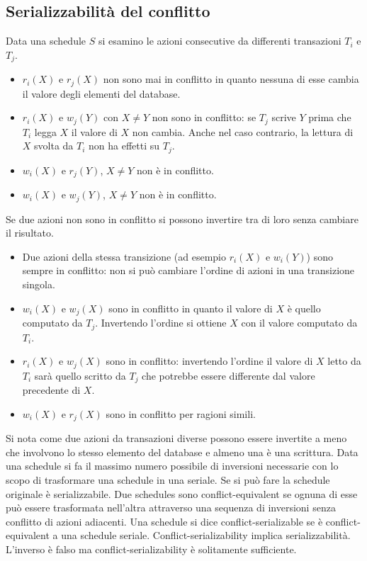 \subsection{Serializzabilit\`a del conflitto}
Data una schedule $S$ si esamino le azioni consecutive da differenti transazioni $T_i$ e $T_j$.
\begin{itemize}
\item $r_i(X)$ e $r_j(X)$ non sono mai in conflitto in quanto nessuna di esse cambia il valore degli elementi del database.
\item $r_i(X)$ e $w_j(Y)$ con $X\neq Y$ non sono in conflitto: se $T_j$ scrive $Y$ prima che $T_i$ legga $X$ il valore di $X$ non cambia. Anche nel caso contrario, la lettura di $X$ svolta da $T_i$ non ha effetti su $T_j$.
\item $w_i(X)$ e $r_j(Y)$, $X\neq Y$ non \`e in conflitto.
\item $w_i(X)$ e $w_j(Y)$, $X\neq Y$ non \`e in conflitto.
\end{itemize}
Se due azioni non sono in conflitto si possono invertire tra di loro senza cambiare il risultato.
\begin{itemize}
\item Due azioni della stessa transizione (ad esempio $r_i(X)$ e $w_i(Y)$) sono sempre in conflitto: non si pu\`o cambiare l'ordine di azioni in una transizione singola.
\item $w_i(X)$ e $w_j(X)$ sono in conflitto in quanto il valore di $X$ \`e quello computato da $T_j$. Invertendo l'ordine si ottiene $X$ con il valore computato da $T_i$.
\item $r_i(X)$ e $w_j(X)$ sono in conflitto: invertendo l'ordine il valore di $X$ letto da $T_i$ sar\`a quello scritto da $T_j$ che potrebbe essere differente dal valore precedente di $X$.
\item $w_i(X)$ e $r_j(X)$ sono in conflitto per ragioni simili.
\end{itemize}
Si nota come due azioni da transazioni diverse possono essere invertite a meno che involvono lo stesso elemento del database e almeno una \`e una scrittura. Data una schedule si fa il massimo numero possibile
di inversioni necessarie con lo scopo di trasformare una schedule in una seriale. Se si pu\`o fare la schedule originale \`e serializzabile. Due schedules sono conflict-equivalent se ognuna di esse pu\`o essere
trasformata nell'altra attraverso una sequenza di inversioni senza conflitto di azioni adiacenti. Una schedule si dice conflict-serializable se \`e conflict-equivalent a una schedule seriale. Conflict-serializability 
implica serializzabilit\`a. L'inverso \`e falso ma conflict-serializability \`e solitamente sufficiente. 
